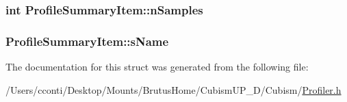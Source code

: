 \subsubsection[{n\+Samples}]{\setlength{\rightskip}{0pt plus 5cm}int Profile\+Summary\+Item\+::n\+Samples}\label{struct_profile_summary_item_adb8b4578844aaa85bd0bd7f970e23959}
\hypertarget{struct_profile_summary_item_ae37c58451ea8907b3b6580066bf48a71}{}
\subsubsection[{s\+Name}]{ Profile\+Summary\+Item\+::s\+Name}\label{struct_profile_summary_item_ae37c58451ea8907b3b6580066bf48a71}


The documentation for this struct was generated from the following file\+:\begin{DoxyCompactItemize}
\item 
/\+Users/cconti/\+Desktop/\+Mounts/\+Brutus\+Home/\+Cubism\+U\+P\+\_\+D/\+Cubism/\hyperlink{_profiler_8h}{Profiler.\+h}\end{DoxyCompactItemize}
